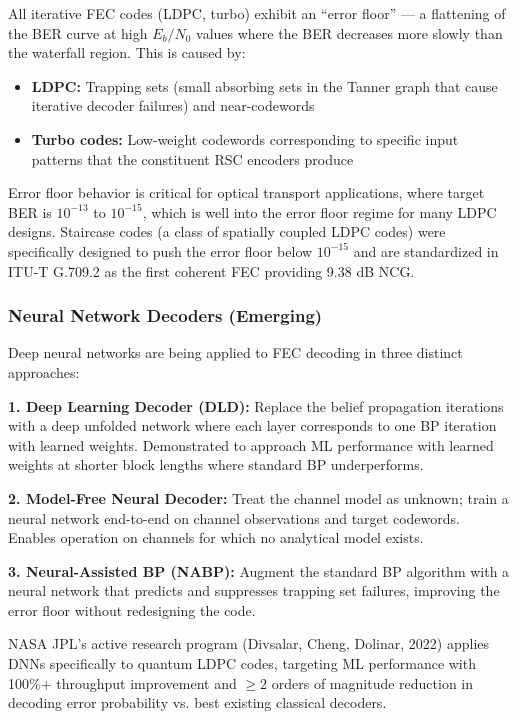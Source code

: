 \documentclass[11pt,letterpaper]{article}
\begin{document}
All iterative FEC codes (LDPC, turbo) exhibit an ``error floor'' --- a flattening of the BER curve at high $E_b/N_0$ values where the BER decreases more slowly than the waterfall region. This is caused by:
\begin{itemize}[leftmargin=*]
  \item \textbf{LDPC:} Trapping sets (small absorbing sets in the Tanner graph that cause iterative decoder failures) and near-codewords
  \item \textbf{Turbo codes:} Low-weight codewords corresponding to specific input patterns that the constituent RSC encoders produce
\end{itemize}

Error floor behavior is critical for optical transport applications, where target BER is $10^{-13}$ to $10^{-15}$, which is well into the error floor regime for many LDPC designs. Staircase codes (a class of spatially coupled LDPC codes) were specifically designed to push the error floor below $10^{-15}$ and are standardized in ITU-T G.709.2 as the first coherent FEC providing 9.38 dB NCG.

\subsubsection{Neural Network Decoders (Emerging)}

Deep neural networks are being applied to FEC decoding in three distinct approaches:

\textbf{1. Deep Learning Decoder (DLD):} Replace the belief propagation iterations with a deep unfolded network where each layer corresponds to one BP iteration with learned weights. Demonstrated to approach ML performance with learned weights at shorter block lengths where standard BP underperforms.

\textbf{2. Model-Free Neural Decoder:} Treat the channel model as unknown; train a neural network end-to-end on channel observations and target codewords. Enables operation on channels for which no analytical model exists.

\textbf{3. Neural-Assisted BP (NABP):} Augment the standard BP algorithm with a neural network that predicts and suppresses trapping set failures, improving the error floor without redesigning the code.

NASA JPL's active research program (Divsalar, Cheng, Dolinar, 2022) applies DNNs specifically to quantum LDPC codes, targeting ML performance with 100\%+ throughput improvement and $\geq 2$ orders of magnitude reduction in decoding error probability vs. best existing classical decoders.
\end{document}
